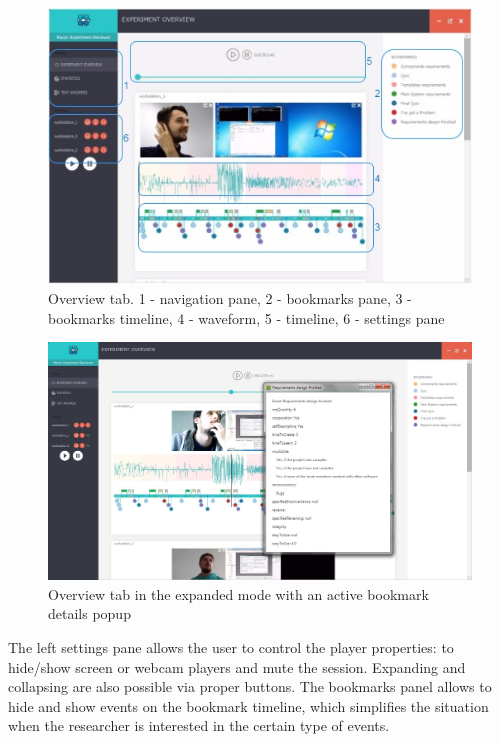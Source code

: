  \begin{figure}[htb]
 \centering
\includegraphics[width=\textwidth]{figures/overview.jpg}
\caption{Overview tab. 1 - navigation pane, 2 - bookmarks pane, 3 - bookmarks timeline, 4 - waveform, 5 - timeline, 6 - settings pane}
\label{fig:overview}
 \end{figure} 
 
  \begin{figure}[htb]
 \centering
\includegraphics[width=\textwidth]{figures/overview2.jpg}
\caption{Overview tab in the expanded mode with an active bookmark details popup}
\label{fig:overview2}
 \end{figure} 

The left settings pane allows the user to control the player properties: to hide/show screen or webcam players and mute the session. Expanding and collapsing are also possible via proper buttons. The bookmarks panel allows to hide and show events on the bookmark timeline, which simplifies the situation when the researcher is interested in the certain type of events.\\



